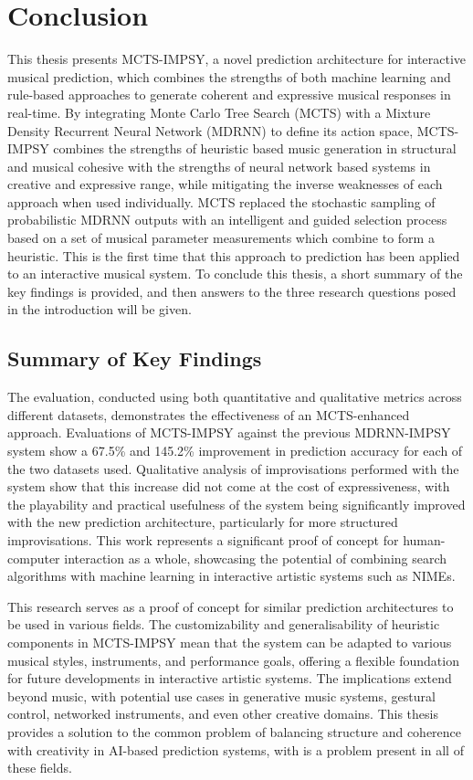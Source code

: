 \chapter{Conclusion}\label{chap:conclusion}

This thesis presents MCTS-IMPSY, a novel prediction architecture for interactive musical prediction, which combines the strengths of both machine learning and rule-based approaches to generate coherent and expressive musical responses in real-time. By integrating Monte Carlo Tree Search (MCTS) with a Mixture Density Recurrent Neural Network (MDRNN) to define its action space, MCTS-IMPSY combines the strengths of heuristic based music generation in structural and musical cohesive with the strengths of neural network based systems in creative and expressive range, while mitigating the inverse weaknesses of each approach when used individually. MCTS replaced the stochastic sampling of probabilistic MDRNN outputs with an intelligent and guided selection process based on a set of musical parameter measurements which combine to form a heuristic. This is the first time that this approach to prediction has been applied to an interactive musical system. To conclude this thesis, a short summary of the key findings is provided, and then answers to the three research questions posed in the introduction will be given.

\section{Summary of Key Findings}

The evaluation, conducted using both quantitative and qualitative metrics across different datasets, demonstrates the effectiveness of an MCTS-enhanced approach. Evaluations of MCTS-IMPSY against the previous MDRNN-IMPSY system show a 67.5\% and 145.2\% improvement in prediction accuracy for each of the two datasets used. Qualitative analysis of improvisations performed with the system show that this increase did not come at the cost of expressiveness, with the playability and practical usefulness of the system being significantly improved with the new prediction architecture, particularly for more structured improvisations. This work represents a significant proof of concept for human-computer interaction as a whole, showcasing the potential of combining search algorithms with machine learning in interactive artistic systems such as NIMEs.

This research serves as a proof of concept for similar prediction architectures to be used in various fields. The customizability and generalisability of heuristic components in MCTS-IMPSY mean that the system can be adapted to various musical styles, instruments, and performance goals, offering a flexible foundation for future developments in interactive artistic systems. The implications extend beyond music, with potential use cases in generative music systems, gestural control, networked instruments, and even other creative domains. This thesis provides a solution to the common problem of balancing structure and coherence with creativity in AI-based prediction systems, with is a problem present in all of these fields.

